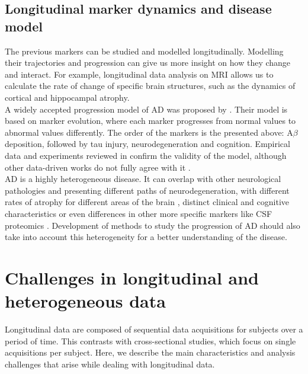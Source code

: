 \subsection{Longitudinal marker dynamics and disease model}

The previous markers can be studied and modelled longitudinally. Modelling their trajectories and progression can give us more insight on how they change and interact. For example, longitudinal data analysis on MRI allows us to calculate the rate of change of specific brain structures, such as the dynamics of cortical and hippocampal atrophy. \\

A widely accepted progression model of AD was proposed by \cite{Jack2010}. Their model is based on marker evolution, where each marker progresses from normal values to abnormal values differently. The order of the markers is the presented above: A$\beta$ deposition, followed by tau injury, neurodegeneration and cognition. Empirical data and experiments reviewed in \cite{Jack2013} confirm the validity of the model, although other data-driven works do not fully agree with it \cite{Iturria-Medina2016}. \\

AD is a highly heterogeneous disease. It can overlap with other neurological pathologies and presenting different paths of neurodegeneration, with different rates of atrophy for different areas of the brain \cite{Lam2013,Poulakis2018}, distinct clinical and cognitive characteristics \cite{Murray2011} or even differences in other more specific markers like CSF proteomics \cite{Tijms2020}. Development of methods to study the progression of AD should also take into account this heterogeneity for a better understanding of the disease. \\

\section{Challenges in longitudinal and heterogeneous data}

Longitudinal data are composed of sequential data acquisitions for subjects over a period of time. This contrasts with cross-sectional studies, which focus on single acquisitions per subject. Here, we describe the main characteristics and analysis challenges that arise while dealing with longitudinal data. \\

